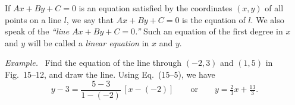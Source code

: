 \documentclass[11pt]{book}
\theoremstyle{bkplain}
\newenvironment{XVexample}[1][]{\par\medskip\noindent\emph{Example#1.}\ }{\par\medskip}
\begin{document}
\begin{definition}
If $Ax + By + C = 0$ is an equation satisfied by the coordinates $(x, y)$ of
all points on a line $l$, we say that $Ax + By + C = 0$ is the equation of
$l$. We also speak of the \emph{``line $Ax + By + C = 0$.''} Such an equation
of the first degree in $x$ and $y$ will be called a \emph{linear equation} in
$x$ and $y$.
\end{definition}

\FIGXVTWELVE

\begin{XVexample}
Find the equation of the line through $(-2, 3)$ and $(1, 5)$ in Fig.~15--12,
and draw the line. Using Eq.~(15--5), we have
\[
y - 3 = \frac{5-3}{1-(-2)}\,[x-(-2)]
\qquad\text{or}\qquad
y = \tfrac{2}{3}x + \tfrac{13}{3}.
\]
\end{XVexample}
\end{document}
